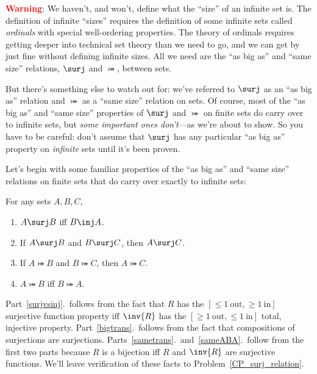 \textbf{\textcolor{red}{Warning}}: We haven't, and won't, define what
the ``size'' of an infinite set is.  The definition of infinite
``sizes'' requires the definition of some infinite sets called
\emph{ordinals} with special well-ordering properties.  The theory of
ordinals requires getting deeper into technical set theory than we
need to go, and we can get by just fine without defining infinite
sizes.  All we need are the ``as big as'' and ``same size'' relations,
$\surj$ and $\bij$, between sets.

But there's something else to watch out for: we've referred to $\surj$
as an ``as big as'' relation and $\bij$ as a ``same size'' relation on
sets.  Of course, most of the ``as big as'' and ``same size''
properties of $\surj$ and $\bij$ on finite sets do carry over to
infinite sets, but \emph{some important ones don't}---as we're about
to show.  So you have to be careful: don't assume that $\surj$ has any
particular ``as big as'' property on \emph{infinite} sets until it's
been proven.

Let's begin with some familiar properties of the ``as big as'' and
``same size'' relations on finite sets that do carry over exactly to
infinite sets:
\begin{lemma}\label{surjinjbij_properties}
For any sets $A,B,C$,
\begin{enumerate}

\item \label{surjvsinj} $A \surj B$ iff $B \inj A$.

\item \label{bigtrans} If $A \surj B$ and $B \surj C$, then $A \surj
  C$.

\item \label{sametrans} If $A \bij B$ and $B \bij C$, then $A \bij C$.

\item\label{sameABA} $A \bij B$ iff $B \bij A$.
\end{enumerate}
\end{lemma}

Part~\ref{surjvsinj}.\ follows from the fact that $R$ has the $[\le
  1\ \text{out}, \ge 1\ \text{in}]$ surjective function property iff
$\inv{R}$ has the $[\ge 1\ \text{out}, \le 1\ \text{in}]$ total,
injective property.  Part~\ref{bigtrans}.\ follows from the fact that
compositions of surjections are surjections.
Parts~\ref{sametrans}.\ and~\ref{sameABA}.\ follow from the first two
parts because $R$ is a bijection iff $R$ and $\inv{R}$ are surjective
functions.  We'll leave verification of these facts to
Problem~\ref{CP_surj_relation}.

